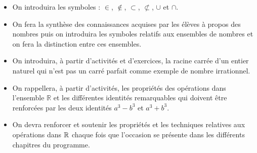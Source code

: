 \begin{tcolorbox}[fichebox, title={Les orientations pédagogiques}]
\begin{itemize}
    \item On introduira les symboles : $\in$, $\notin$, $\subset$, $\not\subset$, $\cup$ et $\cap$.
    
    \item On fera la synthèse des connaissances acquises par les élèves à propos des nombres puis on introduira les symboles relatifs aux ensembles de nombres et on fera la distinction entre ces ensembles.
    
    \item On introduira, à partir d'activités et d'exercices, la racine carrée d'un entier naturel qui n'est pas un carré parfait comme exemple de nombre irrationnel.
    
    \item On rappellera, à partir d'activités, les propriétés des opérations dans l'ensemble $\mathbb{R}$ et les différentes identités remarquables qui doivent être renforcées par les deux identités $a^3 - b^3$ et $a^3 + b^3$.
    
    \item On devra renforcer et soutenir les propriétés et les techniques relatives aux opérations dans $\mathbb{R}$ chaque fois que l'occasion se présente dans les différents chapitres du programme.
\end{itemize}
\end{tcolorbox}


